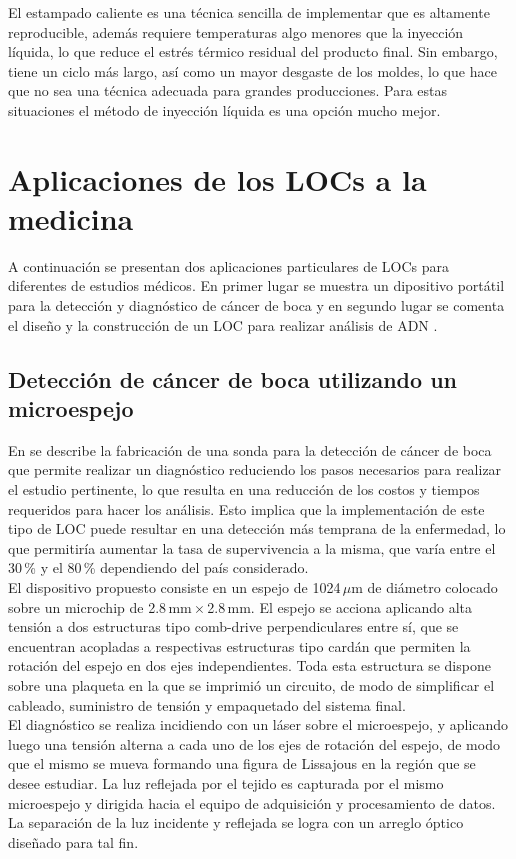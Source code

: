 \documentclass[a4paper, 12pt]{article}
\begin{document}
El estampado caliente es una técnica sencilla de implementar que es altamente reproducible, además requiere temperaturas algo menores que la inyección líquida, lo que reduce el estrés térmico residual del producto final. Sin embargo, tiene un ciclo más largo, así como un mayor desgaste de los moldes, lo que hace que no sea una técnica adecuada para grandes producciones. Para estas situaciones el método de inyección líquida es una opción mucho mejor.

\section{Aplicaciones de los LOCs a la medicina}\label{S:aplic}
A continuación se presentan dos aplicaciones particulares de LOCs para diferentes de estudios médicos. En primer lugar se muestra un dipositivo portátil para la detección y diagnóstico de cáncer de boca \cite{Wang2012} y en segundo lugar se comenta el diseño y la construcción de un LOC para realizar análisis de ADN \cite{Marasso2011}.

\subsection{Detección de cáncer de boca utilizando un microespejo}\label{SS:cancer}
En \cite{Wang2012} se describe la fabricación de una sonda para la detección de cáncer de boca que permite realizar un diagnóstico reduciendo los pasos necesarios para realizar el estudio pertinente, lo que resulta en una reducción de los costos y tiempos requeridos para hacer los análisis. Esto implica que la implementación de este tipo de LOC puede resultar en una detección más temprana de la enfermedad, lo que permitiría aumentar la tasa de supervivencia a la misma, que varía entre el 30\,\% y el 80\,\% dependiendo del país considerado.\\

El dispositivo propuesto consiste en un espejo de 1024\,$\mu$m de diámetro colocado sobre un microchip de 2.8\,mm\,$\times$\,2.8\,mm. El espejo se acciona aplicando alta tensión a dos estructuras tipo comb-drive perpendiculares entre sí, que se encuentran acopladas a respectivas estructuras tipo cardán que permiten la rotación del espejo en dos ejes independientes. Toda esta estructura se dispone sobre una plaqueta en la que se imprimió un circuito, de modo de simplificar el cableado, suministro de tensión y empaquetado del sistema final.\\

El diagnóstico se realiza incidiendo con un láser sobre el microespejo, y aplicando luego una tensión alterna a cada uno de los ejes de rotación del espejo, de modo que el mismo se mueva formando una figura de Lissajous en la región que se desee estudiar. La luz reflejada por el tejido es capturada por el mismo microespejo y dirigida hacia el equipo de adquisición y procesamiento de datos. La separación de la luz incidente y reflejada se logra con un arreglo óptico diseñado para tal fin.\\
\end{document}
